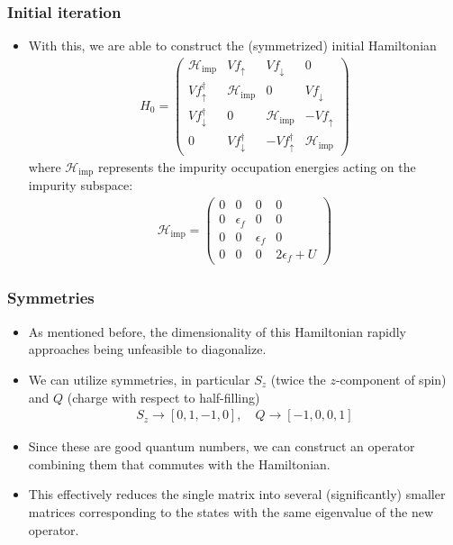 \documentclass{beamer}
\begin{document}
\begin{frame}
  \frametitle{Initial iteration}

  \begin{itemize}
  \item With this, we are able to construct the (symmetrized) initial Hamiltonian
    \begin{gather*}
      H_0 =
      \begin{pmatrix}
        \mathcal{H}_{\mathrm{imp}} & Vf_\uparrow & Vf_\downarrow & 0 \\
        Vf^\dagger_\uparrow & \mathcal{H}_{\mathrm{imp}} & 0 & Vf_\downarrow \\
        Vf^\dagger_\downarrow & 0 & \mathcal{H}_{\mathrm{imp}} & -Vf_\uparrow \\
        0 & Vf^\dagger_\downarrow & -Vf^\dagger_\uparrow & \mathcal{H}_{\mathrm{imp}}
      \end{pmatrix}
    \end{gather*}
    where $\mathcal{H}_{\mathrm{imp}}$ represents the impurity occupation energies acting on the impurity subspace:
    \begin{gather*}
      \mathcal{H}_{\mathrm{imp}} =
      \begin{pmatrix}0 & 0 & 0 & 0 \\  0 & \epsilon_f & 0 & 0 \\ 0 & 0 & \epsilon_f & 0 \\ 0 & 0 & 0 & 2\epsilon_f + U\end{pmatrix}
    \end{gather*}
  \end{itemize}
\end{frame}

\begin{frame}
  \frametitle{Symmetries}

  \begin{itemize}
  \item As mentioned before, the dimensionality of this Hamiltonian rapidly approaches being unfeasible to diagonalize.
  \item We can utilize symmetries, in particular $S_z$ (twice the $z$-component of spin) and $Q$ (charge with respect to half-filling)
    \begin{gather*}
      S_z \rightarrow [0,1,-1,0], \quad Q \rightarrow [-1,0,0,1]
    \end{gather*}
  \item Since these are good quantum numbers, we can construct an operator combining them that commutes with the Hamiltonian.
  \item This effectively reduces the single matrix into several (significantly) smaller matrices corresponding to the states with the same eigenvalue of the new operator.
  \end{itemize}
\end{frame}
\end{document}
